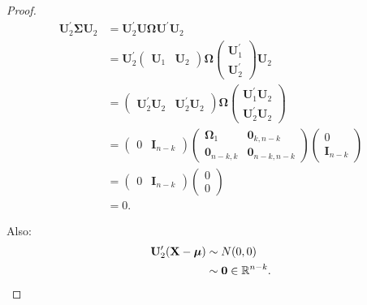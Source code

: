 \documentclass{tstextbook}
\begin{document}
\begin{proof}
	
	
	\[
	\begin{aligned}
		\mathbf{U}_2^\prime \boldsymbol{\Sigma} \mathbf{U}_2 & = \mathbf{U}_2^\prime \mathbf{U} \mathbf{\Omega} \mathbf{U}^\prime \mathbf{U}_2 \\
		& = \mathbf{U}_2^\prime \begin{pmatrix}
			\mathbf{U}_1 & \mathbf{U}_2
		\end{pmatrix} \mathbf{\Omega} \begin{pmatrix}
			\mathbf{U}_1^\prime\\
			\mathbf{U}_2^\prime
		\end{pmatrix} \mathbf{U}_2 \\
		& = \begin{pmatrix}
			\mathbf{U}_2^\prime \mathbf{U}_2 & \mathbf{U}_2^\prime \mathbf{U}_2
		\end{pmatrix} \mathbf{\Omega} \begin{pmatrix}
			\mathbf{U}_1^\prime \mathbf{U}_2\\
			\mathbf{U}_2^\prime \mathbf{U}_2
		\end{pmatrix} \\
		& = \begin{pmatrix}
			0 & \mathbf{I}_{n-k}
		\end{pmatrix}  
		\begin{pmatrix}
			\mathbf{\Omega}_1 		& \boldsymbol{0}_{k,n-k} \\
			\boldsymbol{0}_{n-k,k}		& \boldsymbol{0}_{n-k,n-k}
		\end{pmatrix} 
		\begin{pmatrix}
			0\\
			\mathbf{I}_{n-k}
		\end{pmatrix} \\
		& = \begin{pmatrix}
			0 & \mathbf{I}_{n-k}
		\end{pmatrix}  
		\begin{pmatrix}
			0  \\
			0
		\end{pmatrix} \\
		& = 0 .
	\end{aligned}
	\]
	
	Also: \[ \begin{aligned} \mathbf{U}_2^\prime (\mathbf{X}-\boldsymbol{\mu}) & \sim N(0,0) \\
		& \sim \boldsymbol{0} \in \mathbb R^{n-k}. \end{aligned} \]
	

\end{proof}
\end{document}
